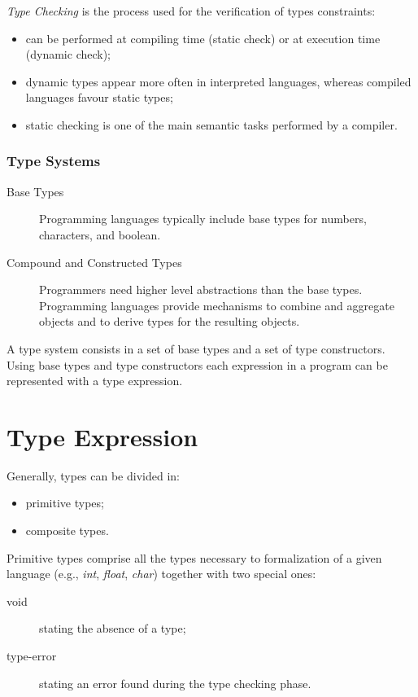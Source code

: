 \emph{Type Checking} is the process used for the verification of types constraints:
\begin{itemize}
    \item
    can be performed at compiling time (static check) or at execution time (dynamic check);
    \item
    dynamic types appear more often in interpreted languages, whereas compiled languages favour static types;
    \item
    static checking is one of the main semantic tasks performed by a compiler.
\end{itemize}
\subsubsection{Type Systems}
\begin{description}
    \item[Base Types]
    Programming languages typically include base types for numbers, characters, and boolean.
    \item[Compound and Constructed Types]
    Programmers need higher level abstractions than the base types.
    Programming languages provide mechanisms to combine and aggregate objects and to derive types for the resulting objects.
\end{description}
A type system consists in a set of base types and a set of type constructors.
Using base types and type constructors each expression in a program can be represented with a type expression.

\section{Type Expression}
Generally, types can be divided in:
\begin{itemize}
    \item
    primitive types;
    \item
    composite types.
\end{itemize}
Primitive types comprise all the types necessary to formalization of a given language (e.g., \emph{int}, \emph{float}, \emph{char}) together with two special ones:
\begin{description}
    \item[void]
    stating the absence of a type;
    \item[type-error]
    stating an error found during the type checking phase.
\end{description}

